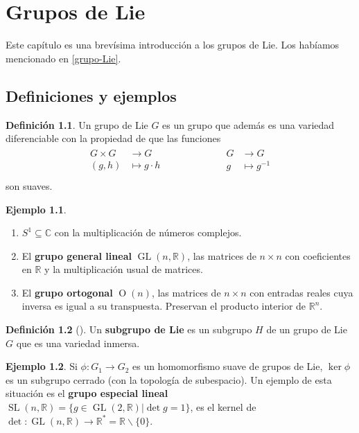 \documentclass[spanish]{book}
\theoremstyle{definition}
\newtheorem*{defn}{Definición}
\newtheorem*{ejem}{Ejemplo}
\newcommand{\R}{\mathbb{R}}
\newcommand{\C}{\mathbb{C}}
\begin{document}
	\fi
	\chapter{Grupos de Lie}
	Este capítulo es una brevísima introducción a los grupos de Lie. Los habíamos mencionado en \cref{grupo-Lie}.
	\section{Definiciones y ejemplos}

	\begin{defn}
Un grupo de Lie $G$ es un grupo que además es una variedad diferenciable con la propiedad de que las funciones
		\begin{align*}
			\begin{aligned}
				G\times G&\to G\\
				(g,h)&\mapsto g\cdot h\\
			\end{aligned}
			\qquad\qquad\qquad
			\begin{aligned}
				G&\to G\\
				g&\mapsto g^{-1}\\
			\end{aligned}
		\end{align*}
		son suaves.
	\end{defn}
	\begin{ejem}\leavevmode
		\begin{enumerate}
			\item $S^1\subseteq\C$ con la multiplicación de números complejos.
			\item El \textbf{grupo general lineal} $\operatorname{GL}(n,\R)$, las matrices de $n\times n$ con coeficientes en $\R$ y la multiplicación usual de matrices. 
			\item El \textbf{grupo ortogonal} $\operatorname{O}(n)$, las matrices de $n\times n$ con entradas reales cuya inversa es igual a su transpuesta. Preservan el producto interior de $\R^n$.
		\end{enumerate}
	\end{ejem}
	\begin{defn}[\cite{ONeill}]
		Un \textbf{subgrupo de Lie} es un subgrupo $H$ de un grupo de Lie $G$ que es una variedad inmersa.
	\end{defn}
	\begin{ejem}
			 Si $\phi:G_1\to G_2$ es un homomorfismo suave de grupos de Lie, $\ker\phi$ es un subgrupo cerrado (con la topología de subespacio). Un ejemplo de esta situación es el \textbf{grupo especial lineal }$\operatorname{SL}(n,\R)=\{g\in\operatorname{GL}(2,\R)|\det g=1\}$, es el kernel de $\det:\operatorname{GL}(n,\R)\to\R^*=\R\backslash\{0\}$.
	\end{ejem}
\end{document}
